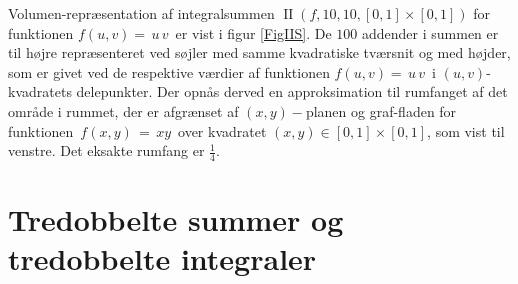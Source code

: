 \begin{example} \label{exampDobbeltSumUV}
Volumen-repræsentation af
integralsummen $\operatorname{II}(f,10, 10, [0,1] \times
[0,1])$  for funktionen $f(u,v) = \,u\,v\,$ er vist i figur \ref{FigIIS}. De
$100$ addender i summen er til højre repræsenteret ved
søjler med samme kvadratiske tværsnit og med
højder, som er givet ved de respektive værdier af
funktionen $f(u,v) = \,u\,v\,$ i
$(u,v)$-kvadratets delepunkter. Der opnås derved en approksimation til rumfanget
af det område i rummet, der er afgrænset af $(x,y)-$planen og graf-fladen for funktionen
$\,f(x,y) \, = \, xy\,$ over kvadratet $(x, y) \in  [0,1] \times
[0,1]$, som vist til venstre. Det eksakte rumfang er $\frac{1}{4}$.
\end{example}




\section{Tredobbelte summer og tredobbelte integraler} \label{secTreSummer}


